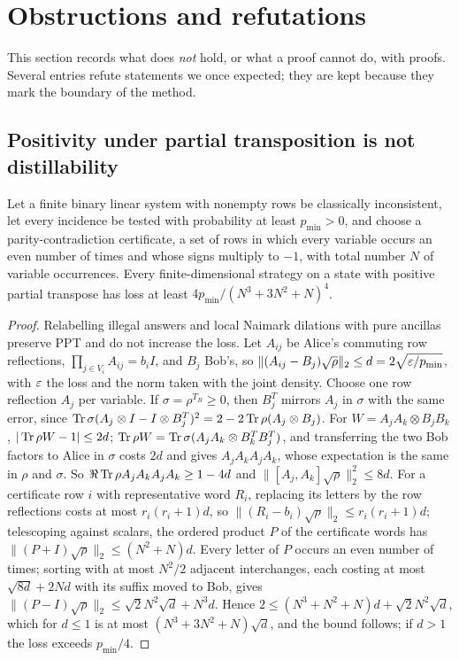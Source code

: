 \section{Obstructions and refutations}\label{sec:obstructions}

This section records what does \emph{not} hold, or what a proof cannot do, with proofs. Several entries refute statements we
once expected; they are kept because they mark the boundary of the method.

\subsection{Positivity under partial transposition is not distillability}\label{sec:ppt}

\begin{theorem}\label{thm:ppt-gap}
Let a finite binary linear system with nonempty rows be classically inconsistent, let every incidence be tested with
probability at least $p_{\min}>0$, and choose a parity-contradiction certificate, a set of rows in which every variable occurs an
even number of times and whose signs multiply to $-1$, with total number $N$ of variable occurrences. Every finite-dimensional
strategy on a state with positive partial transpose has loss at least $4p_{\min}/(N^3+3N^2+N)^4$.
\end{theorem}

\begin{proof}
Relabelling illegal answers and local Naimark dilations with pure ancillas preserve PPT and do not increase the loss. Let
$A_{ij}$ be Alice's commuting row reflections, $\prod_{j\in V_i}A_{ij}=b_iI$, and $B_j$ Bob's, so $\|(A_{ij}-B_j)\sqrt\rho\|_2\le d=2\sqrt{\varepsilon/p_{\min}}$,
with $\varepsilon$ the loss and the norm taken with the joint density. Choose one row reflection $A_j$ per variable. If
$\sigma=\rho^{T_B}\ge0$, then $B_j^T$ mirrors $A_j$ in $\sigma$ with the same error, since $\operatorname{Tr}\sigma(A_j\otimes I-I\otimes B_j^T)^2=
2-2\operatorname{Tr}\rho(A_j\otimes B_j)$. For $W=A_jA_k\otimes B_jB_k$, $|\operatorname{Tr}\rho W-1|\le2d$; $\operatorname{Tr}\rho W=\operatorname{Tr}\sigma(A_jA_k\otimes B_k^TB_j^T)$, and transferring
the two Bob factors to Alice in $\sigma$ costs $2d$ and gives $A_jA_kA_jA_k$, whose expectation is the same in $\rho$ and $\sigma$. So
$\Re\operatorname{Tr}\rho A_jA_kA_jA_k\ge1-4d$ and $\|[A_j,A_k]\sqrt\rho\|_2^2\le8d$. For a certificate row $i$ with representative word $R_i$,
replacing its letters by the row reflections costs at most $r_i(r_i+1)d$, so $\|(R_i-b_i)\sqrt\rho\|_2\le r_i(r_i+1)d$; telescoping
against scalars, the ordered product $P$ of the certificate words has $\|(P+I)\sqrt\rho\|_2\le(N^2+N)d$. Every letter of $P$ occurs
an even number of times; sorting with at most $N^2/2$ adjacent interchanges, each costing at most $\sqrt{8d}+2Nd$ with its suffix
moved to Bob, gives $\|(P-I)\sqrt\rho\|_2\le\sqrt2N^2\sqrt d+N^3d$. Hence $2\le(N^3+N^2+N)d+\sqrt2N^2\sqrt d$, which for $d\le1$ is
at most $(N^3+3N^2+N)\sqrt d$, and the bound follows; if $d>1$ the loss exceeds $p_{\min}/4$.
\end{proof}

